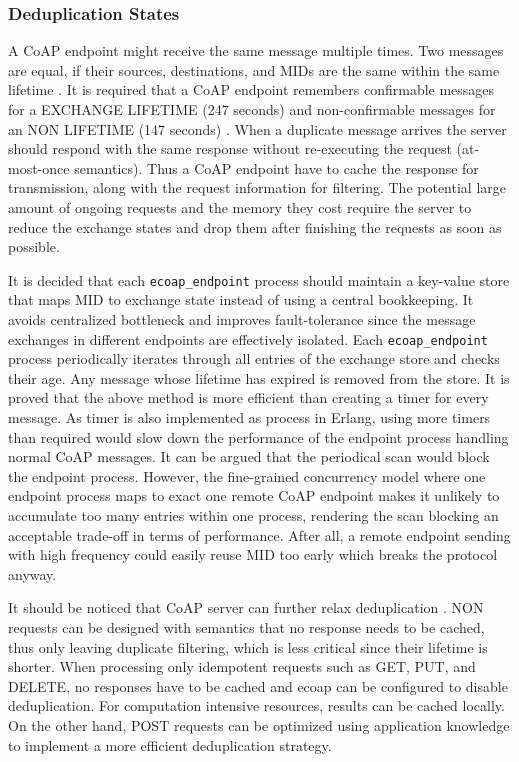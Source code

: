 \subsubsection{Deduplication States}

A CoAP endpoint might receive the same message multiple times. Two messages are equal, if their sources, destinations, and MIDs are the same within the same lifetime \autocite{lanter2013scalability}. It is required that a CoAP endpoint remembers confirmable messages for a EXCHANGE LIFETIME (247 seconds) and non-confirmable messages for an NON LIFETIME (147 seconds) \autocite{coap_protocol}. When a duplicate message arrives the server should respond with the same response without re-executing the request (at-most-once semantics). Thus a CoAP endpoint have to cache the response for transmission, along with the request information for filtering. The potential large amount of ongoing requests and the memory they cost require the server to reduce the exchange states and drop them after finishing the requests as soon as possible. 

It is decided that each \verb|ecoap_endpoint| process should maintain a key-value store that maps MID to exchange state instead of using a central bookkeeping. It avoids centralized bottleneck and improves fault-tolerance since the message exchanges in different endpoints are effectively isolated. Each \verb|ecoap_endpoint| process periodically iterates through all entries of the exchange store and checks their age. Any message whose lifetime has expired is removed from the store. It is proved that the above method is more efficient than creating a timer for every message. As timer is also implemented as process in Erlang, using more timers than required would slow down the performance of the endpoint process handling normal CoAP messages. It can be argued that the periodical scan would block the endpoint process. However, the fine-grained concurrency model where one endpoint process maps to exact one remote CoAP endpoint makes it unlikely to accumulate too many entries within one process, rendering the scan blocking an acceptable trade-off in terms of performance. After all, a remote endpoint sending with high frequency could easily reuse MID too early which breaks the protocol anyway.


It should be noticed that CoAP server can further relax deduplication \autocite{coap_protocol}. NON requests can be designed with semantics that no response needs to be cached, thus only leaving duplicate filtering, which is less critical since their lifetime is shorter. When processing only idempotent requests such as GET, PUT, and DELETE, no responses have to be cached and ecoap can be configured to disable deduplication. For computation intensive resources, results can be cached locally. On the other hand, POST requests can be optimized using application knowledge to implement a more efficient deduplication strategy. 


